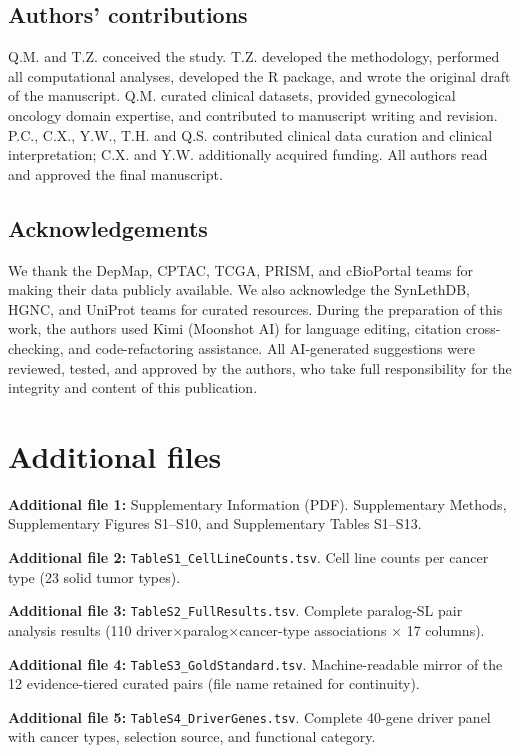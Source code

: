 \documentclass[11pt,a4paper]{article}
\begin{document}
\subsection*{Authors' contributions}
Q.M. and T.Z. conceived the study. T.Z. developed the methodology, performed all computational analyses, developed the R package, and wrote the original draft of the manuscript. Q.M. curated clinical datasets, provided gynecological oncology domain expertise, and contributed to manuscript writing and revision. P.C., C.X., Y.W., T.H. and Q.S. contributed clinical data curation and clinical interpretation; C.X. and Y.W. additionally acquired funding. All authors read and approved the final manuscript.

\subsection*{Acknowledgements}
We thank the DepMap, CPTAC, TCGA, PRISM, and cBioPortal teams for making their data publicly available. We also acknowledge the SynLethDB, HGNC, and UniProt teams for curated resources. During the preparation of this work, the authors used Kimi (Moonshot AI) for language editing, citation cross-checking, and code-refactoring assistance. All AI-generated suggestions were reviewed, tested, and approved by the authors, who take full responsibility for the integrity and content of this publication.

\section*{Additional files}

\noindent\textbf{Additional file 1:} Supplementary Information (PDF). Supplementary Methods, Supplementary Figures S1--S10, and Supplementary Tables S1--S13.

\noindent\textbf{Additional file 2:} \texttt{TableS1\_CellLineCounts.tsv}. Cell line counts per cancer type (23 solid tumor types).

\noindent\textbf{Additional file 3:} \texttt{TableS2\_FullResults.tsv}. Complete paralog-SL pair analysis results (110 driver$\times$paralog$\times$cancer-type associations $\times$ 17 columns).

\noindent\textbf{Additional file 4:} \texttt{TableS3\_GoldStandard.tsv}. Machine-readable mirror of the 12 evidence-tiered curated pairs (file name retained for continuity).

\noindent\textbf{Additional file 5:} \texttt{TableS4\_DriverGenes.tsv}. Complete 40-gene driver panel with cancer types, selection source, and functional category.
\end{document}
